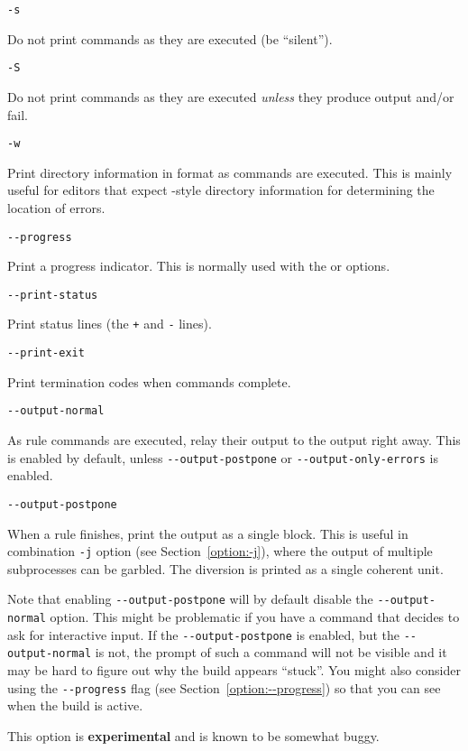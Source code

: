  \verb+-s+

Do not print commands as they are executed (be ``silent'').

 \verb+-S+

Do not print commands as they are executed \emph{unless} they produce output and/or
fail.

 \verb+-w+

Print directory information in  format as commands are executed.
This is mainly useful for editors that expect -style
directory information for determining the location of errors.

 \verb+--progress+

Print a progress indicator.
This is normally used with the  or  options.

 \verb+--print-status+

Print status lines (the \verb/+/ and \verb/-/ lines).

 \verb+--print-exit+

Print termination codes when commands complete.

 \verb+--output-normal+

As rule commands are executed, relay their output to the \OMake{} output right away. This is enabled
by default, unless \verb+--output-postpone+ or \verb+--output-only-errors+ is enabled.

 \verb+--output-postpone+

When a rule finishes, print the output as a single block.  This is useful in combination \verb+-j+
option (see Section~\ref{option:-j}), where the output of multiple subprocesses can be garbled.  The
diversion is printed as a single coherent unit.

Note that enabling \verb+--output-postpone+ will by default disable the \verb+--output-normal+
option. This might be problematic if you have a command that decides to ask for interactive input.
If the \verb+--output-postpone+ is enabled, but the \verb+--output-normal+ is not, the prompt of
such a command will not be visible and it may be hard to figure out why the build appears ``stuck''.
You might also consider using the \verb+--progress+ flag (see Section~\ref{option:--progress}) so
that you can see when the build is active. 

This option is \textbf{experimental} and is known to be somewhat buggy.

